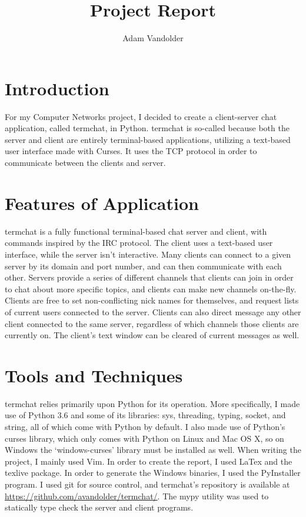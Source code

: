 \documentclass{article}
\title{Project Report}
\author{Adam Vandolder}
\date{}
\begin{document}
    \maketitle
    \tableofcontents
    \newpage
    \linespread{1.6}
    \selectfont

    \section{Introduction}
    For my Computer Networks project, I decided to create a client-server chat
    application, called termchat, in Python. termchat is so-called because both
    the server and client are entirely terminal-based applications, utilizing a
    text-based user interface made with Curses. It uses the TCP protocol in
    order to communicate between the clients and server.

    \section{Features of Application}
    termchat is a fully functional terminal-based chat server and client, with
    commands inspired by the IRC protocol. The client uses a text-based user
    interface, while the server isn't interactive. Many clients can connect to a
    given server by its domain and port number, and can then communicate with
    each other. Servers provide a series of different channels that clients can
    join in order to chat about more specific topics, and clients can make new
    channels on-the-fly. Clients are free to set non-conflicting nick names for
    themselves, and request lists of current users connected to the server.
    Clients can also direct message any other client connected to the same
    server, regardless of which channels those clients are currently on. The
    client's text window can be cleared of current messages as well.
    
    \section{Tools and Techniques}
    termchat relies primarily upon Python for its operation.
    More specifically, I made use of Python 3.6 and some of its libraries: sys,
    threading, typing, socket, and string, all of which come with Python by
    default. I also made use of Python's curses library, which only comes with
    Python on Linux and Mac OS X, so on Windows the `windows-curses' library
    must be installed as well. When writing the project, I mainly used Vim. In
    order to create the report, I used LaTex and the texlive package. In order
    to generate the Windows binaries, I used the PyInstaller program. I used git
    for source control, and termchat's repository is available at
    \url{https://github.com/avandolder/termchat/}. The mypy utility was used to
    statically type check the server and client programs.
\end{document}
